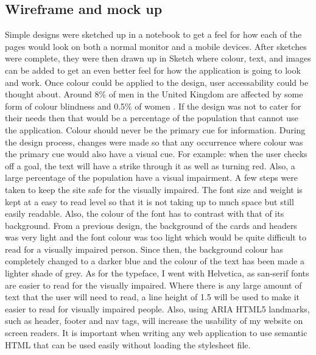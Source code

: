 \subsection{Wireframe and mock up}
Simple designs were sketched up in a notebook to get a feel for how each of the pages would look on both a normal monitor and a mobile devices. After sketches were complete, they were then drawn up in Sketch \citep{sketch:2013} where colour, text, and images can be added to get an even better feel for how the application is going to look and work. Once colour could be applied to the design, user accessability could be thought about. Around 8\% of men in the United Kingdom are affected by some form of colour blindness and 0.5\% of women \citep{colourBlind}. If the design was not to cater for their needs then that would be a percentage of the population that cannot use the application. Colour should never be the primary cue for information. During the design process, changes were made so that any occurrence where colour was the primary cue would also have a visual cue. For example: when the user checks off a goal, the text will have a strike through it as well as turning red. Also, a large percentage of the population have a visual impairment. A few steps were taken to keep the site safe for the visually impaired. The font size and weight is kept at a easy to read level so that it is not taking up to much space but still easily readable. Also, the colour of the font has to contrast with that of its background. From a previous design, the background of the cards and headers was very light and the font colour was too light which would be quite difficult to read for a visually impaired person. Since then, the background colour has completely changed to a darker blue and the colour of the text has been made a lighter shade of grey. As for the typeface, I went with Helvetica, as san-serif fonts are easier to read for the visually impaired. Where there is any large amount of text that the user will need to read, a line height of 1.5 will be used to make it easier to read for visually impaired people. Also, using ARIA HTML5 landmarks, such as header, footer and nav tags, will increase the usability of my website on screen readers. It is important when writing any web application to use semantic HTML that can be used easily without loading the stylesheet file.\\

